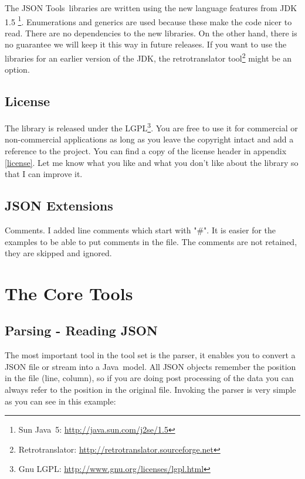 \documentclass[a4paper]{article}
\newcommand{\jtools}{JSON Tools}
\newcommand{\java}{Java}
\begin{document}
The \jtools\ libraries are written using the new language features from JDK 1.5 \footnote{Sun \java\ 5: \url{http://java.sun.com/j2se/1.5}}.  Enumerations and generics are used because these make the code nicer to read.  There are no dependencies to the new libraries. On the other hand, there is no guarantee we will keep it this way in future releases. If you want to use the libraries for an earlier version of the JDK, the retrotranslator tool\footnote{Retrotranslator: \url{http://retrotranslator.sourceforge.net}} might be an option.

\subsection{License}

The library is released under the LGPL\footnote{Gnu LGPL: \url{http://www.gnu.org/licenses/lgpl.html}}. You are free to use it for commercial or non-commercial applications as long as you leave the copyright intact and add a reference to the project. You can find a copy of the license header in appendix \ref{license}. 
Let me know what you like and what you don't like about the library so that I can improve it.

\subsection{JSON Extensions}

Comments. I added line comments which start with "\#". It is easier for the examples to be able to put comments in the file. The comments are not retained, they are skipped and ignored.

\section{The Core Tools}

\subsection{Parsing - Reading JSON}

The most important tool in the tool set is the parser, it enables you to convert a JSON file or stream into a \java\ model. All JSON objects remember the position in the file (line, column), so if you are doing post processing of the data you can always refer to the position in the original file. 
Invoking the parser is very simple as you can see in this example:
\end{document}
